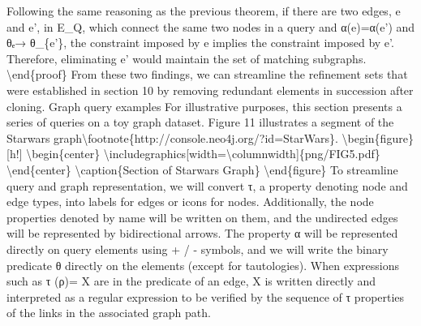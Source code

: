 \documentclass{article}%
\begin{document}
Following the same reasoning as the previous theorem, if there are two edges, e and e', in E\_Q, which connect the same two nodes in a query and α(e)=α(e') and θₑ→ θ\_\{e'\}, the constraint imposed by e implies the constraint imposed by e'. Therefore, eliminating e' would maintain the set of matching subgraphs.\newline%
\newline%
\textbackslash{}end\{proof\}\newline%
\newline%
From these two findings, we can streamline the refinement sets that were established in section 10 by removing redundant elements in succession after cloning.\newline%
\newline%
Graph query examples\newline%
\newline%
For illustrative purposes, this section presents a series of queries on a toy graph dataset. Figure 11 illustrates a segment of the Starwars graph\textbackslash{}footnote\{http://console.neo4j.org/?id=StarWars\}.\newline%
\newline%
\textbackslash{}begin\{figure\}{[}h!{]}\newline%
\textbackslash{}begin\{center\}\newline%
\textbackslash{}includegraphics{[}width=\textbackslash{}columnwidth{]}\{png/FIG5.pdf\}\newline%
\textbackslash{}end\{center\}\newline%
\textbackslash{}caption\{Section of Starwars Graph\}\newline%
\textbackslash{}end\{figure\}\newline%
\newline%
To streamline query and graph representation, we will convert τ, a property denoting node and edge types, into labels for edges or icons for nodes. Additionally, the node properties denoted by name will be written on them, and the undirected edges will be represented by bidirectional arrows. The property α will be represented directly on query elements using + / {-} symbols, and we will write the binary predicate θ directly on the elements (except for tautologies). When expressions such as τ (ρ)= X are in the predicate of an edge, X is written directly and interpreted as a regular expression to be verified by the sequence of τ properties of the links in the associated graph path.\newline%
\newline%
\end{document}
